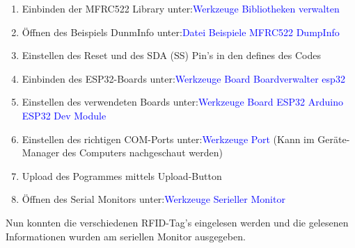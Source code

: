 \begin{enumerate}
\item Einbinden der MFRC522 Library unter:\newline\textcolor{blue}{Werkzeuge \textrightarrow Bibliotheken verwalten} \newline
\item Öffnen des Beispiels DunmInfo unter:\newline\textcolor{blue}{Datei \textrightarrow Beispiele \textrightarrow MFRC522 \textrightarrow DumpInfo} \newline
\item Einstellen des Reset und des SDA (SS) Pin's in den defines des Codes\newline
\item Einbinden des ESP32-Boards unter:\newline\textcolor{blue}{Werkzeuge \textrightarrow Board \textrightarrow Boardverwalter \textrightarrow esp32} \newline
\item Einstellen des verwendeten Boards unter:\newline\textcolor{blue}{Werkzeuge \textrightarrow Board \textrightarrow ESP32 Arduino \textrightarrow ESP32 Dev Module} \newline
\item Einstellen des richtigen COM-Ports unter:\newline\textcolor{blue}{Werkzeuge \textrightarrow Port} (Kann im Geräte-Manager des Computers nachgeschaut werden) \newline
\item Upload des Pogrammes mittels Upload-Button \newline
\item Öffnen des Serial Monitors unter:\newline\textcolor{blue}{Werkzeuge \textrightarrow  Serieller Monitor} \newline
\end{enumerate}

Nun konnten die verschiedenen RFID-Tag's eingelesen werden und  die gelesenen Informationen wurden am seriellen Monitor ausgegeben. \cite{pcbreflux_esp32_2017}




